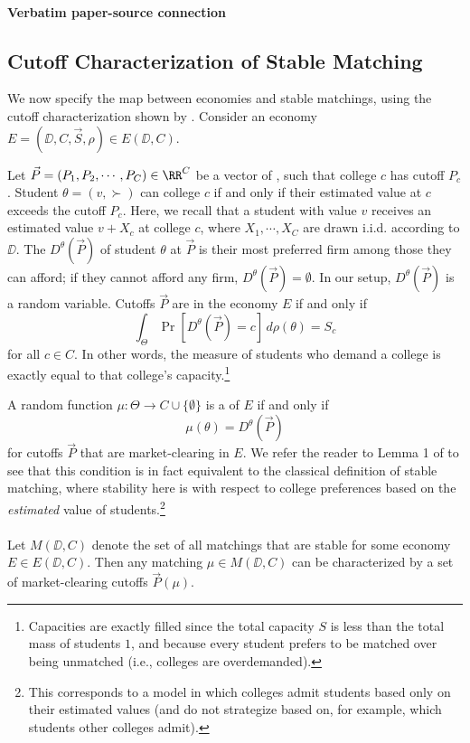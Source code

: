 \documentclass[10pt]{article}
\begin{document}
\paragraph{Verbatim paper-source connection}
\begin{ReviewVerbatim}
\subsection{Cutoff Characterization of Stable Matching}
We now specify the map between economies and stable matchings, using the cutoff characterization shown by \citet{azevedo2016supply}. Consider an economy $E = (\DD, C, \vec{S}, \rho) \in E(\DD,C).$

Let $\vec{P} = (P_1, P_2, \cdots, P_C)\in \RR^C$ be a vector of , such that college $c$ has cutoff $P_c$. Student $\theta = (v, \succ)$ can  college $c$ if and only if their estimated value at $c$ exceeds the cutoff $P_c$. Here, we recall that a student with value $v$ receives an estimated value $v + X_c$ at college $c$, where $X_1,\cdots,X_C$ are drawn i.i.d. according to $\DD$. The  $D^\theta(\vec{P})$ of student $\theta$ at $\vec{P}$ is their most preferred firm among those they can afford; if they cannot afford any firm, $D^\theta(\vec{P}) = \emptyset$. In our setup, $D^\theta(\vec{P})$ is a random variable. Cutoffs $\vec{P}$ are  in the economy $E$ if and only if
\begin{equation}
    \int_{\Theta} \Pr\left[D^\theta(\vec{P})=c\right] \,d\rho(\theta) = S_c
\end{equation}
for all $c\in C$. In other words, the measure of students who demand a college is exactly equal to that college's capacity.\footnote{Capacities are exactly filled since the total capacity $S$ is less than the total mass of students $1$, and because every student prefers to be matched over being unmatched (i.e., colleges are overdemanded).}

A random function $\mu:\Theta\rightarrow C\cup \{\emptyset\}$ is a  of $E$ if and only if
\begin{equation}
    \mu(\theta) = D^\theta(\vec{P})
\end{equation}
for cutoffs $\vec{P}$ that are market-clearing in $E$. We refer the reader to Lemma 1 of \cite{azevedo2016supply} to see that this condition is in fact equivalent to the classical definition of stable matching, where stability here is with respect to college preferences based on the \textit{estimated} value of students.\footnote{This corresponds to a model in which colleges admit students based only on their estimated values (and do not strategize based on, for example, which students other colleges admit).}
\\
\\
Let $M(\DD, C)$ denote the set of all matchings that are stable for some economy $E\in E(\DD, C).$ Then any matching $\mu\in M(\DD, C)$ can be characterized by a set of market-clearing cutoffs $\vec{P}(\mu).$
\end{ReviewVerbatim}
\end{document}
